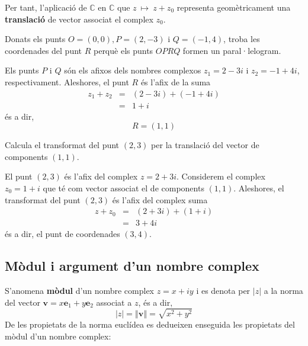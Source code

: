Per tant, l’aplicació de $\mathbb{C}$ en $\mathbb{C}$ que $
z~\longmapsto ~z+z_{0}$ representa geomètricament una \textbf{translació} de vector associat el complex $z_{0}$.

\begin{exemple}
Donats els punts $O=(0,0),P=(2,-3)$ i $Q=(-1,4)$, troba les coordenades del
punt $R$ perquè els punts $OPRQ$ formen un paral·lelogram.
\end{exemple}

\begin{solucio}
Els punts $P$ i $Q$ són els afixos dels nombres complexos $z_{1}=2-3i$
i $z_{2}=-1+4i$, respectivament. Aleshores, el punt $R$ és l’afix de la
suma
\begin{eqnarray*}
z_{1}+z_{2} &=&(2-3i)+(-1+4i) \\
&=&1+i
\end{eqnarray*}
és a dir,
\begin{equation*}
R=(1,1)
\end{equation*}
\end{solucio}

\begin{exemple}
Calcula el transformat del punt $(2,3)$ per la translació del vector
de components $(1,1)$.
\end{exemple}

\begin{solucio}
El punt $(2,3)$ és l’afix del complex $z=2+3i$. Considerem el complex
$z_{0}=1+i$ que té com vector associat el de components $(1,1)$.
Aleshores, el transformat del punt $(2,3)$ és l’afix del complex suma
\begin{eqnarray*}
z+z_{0} &=&(2+3i)+(1+i) \\
&=&3+4i
\end{eqnarray*}
és a dir, el punt de coordenades $(3,4)$.
\end{solucio}

\subsection{Mòdul i argument d’un nombre complex}

S’anomena \textbf{mòdul} d’un nombre complex $z=x+iy$ i es denota
per $\left\vert z\right\vert $ a la norma del vector $\mathbf{v}=x\mathbf{e}
_{1}+y\mathbf{e}_{2}$ associat a $z$, és a dir,
\begin{equation*}
\left\vert z\right\vert =\left\Vert \mathbf{v}\right\Vert =\sqrt{x^{2}+y^{2}}
\end{equation*}
De les propietats de la norma euclídea es dedueixen enseguida les
propietats del mòdul d’un nombre complex:

